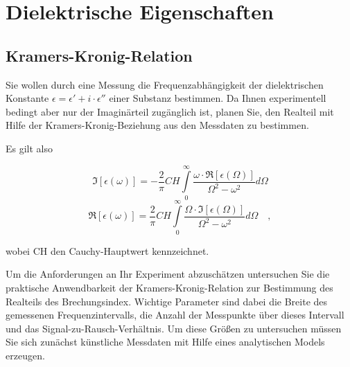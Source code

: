\renewcommand{\lastmod}{\today}

\chapter{Dielektrische Eigenschaften}



\section{Kramers-Kronig-Relation}


Sie wollen durch eine Messung die Frequenzabhängigkeit der dielektrischen Konstante $\epsilon = \epsilon' + i\cdot \epsilon''$ einer Substanz bestimmen. Da Ihnen experimentell bedingt aber nur der Imaginärteil zugänglich ist, planen Sie, den Realteil mit Hilfe der Kramers-Kronig-Beziehung aus den Messdaten zu bestimmen. 

Es gilt also

$$ \Im[\epsilon(\omega)] = - \frac{2}{\pi} CH \int\limits_{0}^{\infty} \frac{\omega \cdot \Re[\epsilon(\Omega)]}{\Omega^2 - \omega^2} d\Omega$$
$$ \Re[\epsilon(\omega)] =   \frac{2}{\pi} CH \int\limits_{0}^{\infty} \frac{\Omega \cdot \Im[\epsilon(\Omega)]}{\Omega^2 - \omega^2} d\Omega\quad,$$

wobei CH den Cauchy-Hauptwert kennzeichnet. 

Um die Anforderungen an Ihr Experiment abzuschätzen untersuchen Sie die praktische Anwendbarkeit der Kramers-Kronig-Relation zur Bestimmung des Realteils des Brechungsindex. Wichtige Parameter sind dabei die Breite des gemessenen Frequenzintervalls, die Anzahl der Messpunkte über dieses Intervall und das Signal-zu-Rausch-Verhältnis. Um diese Größen zu untersuchen müssen Sie sich zunächst künstliche Messdaten mit Hilfe eines analytischen Models erzeugen.

